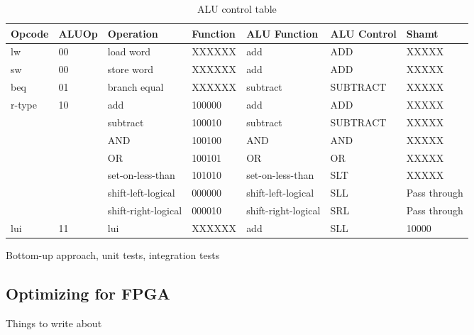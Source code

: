 \begin{table}[ht!]
    \begin{tabular}{|l|l|l|l|l|l|l|}
    \hline
    Opcode & ALUOp & Operation           & Function & ALU Function        & ALU Control & Shamt   \\ \hline
    lw     & 00    & load word           & XXXXXX   & add                 & ADD         & XXXXX \\ \hline
    sw     & 00    & store word          & XXXXXX   & add                 & ADD         & XXXXX \\ \hline
    beq    & 01    & branch equal        & XXXXXX   & subtract            & SUBTRACT    & XXXXX \\ \hline
    r-type & 10    & add                 & 100000   & add                 & ADD         & XXXXX \\ \cline{3-7}
           &       & subtract            & 100010   & subtract            & SUBTRACT    & XXXXX \\ \cline{3-7}
           &       & AND                 & 100100   & AND                 & AND         & XXXXX \\ \cline{3-7}
           &       & OR                  & 100101   & OR                  & OR          & XXXXX \\ \cline{3-7}
           &       & set-on-less-than    & 101010   & set-on-less-than    & SLT         & XXXXX \\ \cline{3-7}
           &       & shift-left-logical  & 000000   & shift-left-logical  & SLL         & Pass through \\ \cline{3-7}
           &       & shift-right-logical & 000010   & shift-right-logical & SRL         & Pass through \\ \hline
    lui    & 11    & lui                 & XXXXXX   & add                 & SLL         & 10000 \\ \hline
    \end{tabular}
    \caption{ALU control table}
    \label{tab:alu-control}
\end{table}

Bottom-up approach, unit tests, integration tests

\subsection{Optimizing for FPGA}


Things to write about

